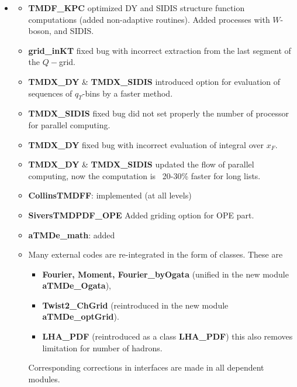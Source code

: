 \documentclass[prd,nofootinbib,eqsecnum,final]{revtex4}
\renewcommand{\(}{\left(}
\renewcommand{\)}{\right)}
\renewcommand{\[}{\left[}
\renewcommand{\]}{\right]}
\begin{document}
\begin{itemize}
\item[\textbf{Ver.3.03}]
\begin{itemize}
	\item \textbf{TMDF\_KPC} optimized DY and SIDIS structure function computations (added non-adaptive routines). Added processes with $W$-boson, and SIDIS.
    \item \textbf{grid\_inKT} fixed bug with incorrect extraction from the last segment of the $Q-$grid.
	\item \textbf{TMDX\_DY} \& \textbf{TMDX\_SIDIS} introduced option for evaluation of sequences of $q_T$-bins by a faster method.
	\item \textbf{TMDX\_SIDIS} fixed bug did not set properly the number of processor for parallel computing.
	\item \textbf{TMDX\_DY} fixed bug with incorrect evaluation of integral over $x_F$.
	\item \textbf{TMDX\_DY} \& \textbf{TMDX\_SIDIS} updated the flow of parallel computing, now the computation is ~20-30\% faster for long lists.
	\item \textbf{CollinsTMDFF}: implemented (at all levels)
	\item \textbf{SiversTMDPDF\_OPE} Added griding option for OPE part.
	\item \textbf{aTMDe\_math}: added
	\item Many external codes are re-integrated in the form of classes.  These are 
	\begin{itemize}
		\item \textbf{Fourier, Moment, Fourier\_byOgata}  (unified in the new module \textbf{aTMDe\_Ogata}), 
		\item \textbf{Twist2\_ChGrid} (reintroduced in the new module \textbf{aTMDe\_optGrid}).
		\item \textbf{LHA\_PDF} (reintroduced as a class \textbf{LHA\_PDF}) this also removes limitation for number of hadrons.
	\end{itemize}
	 Corresponding corrections in interfaces are made in all dependent modules.	


\end{itemize}
\end{itemize}
\end{document}
